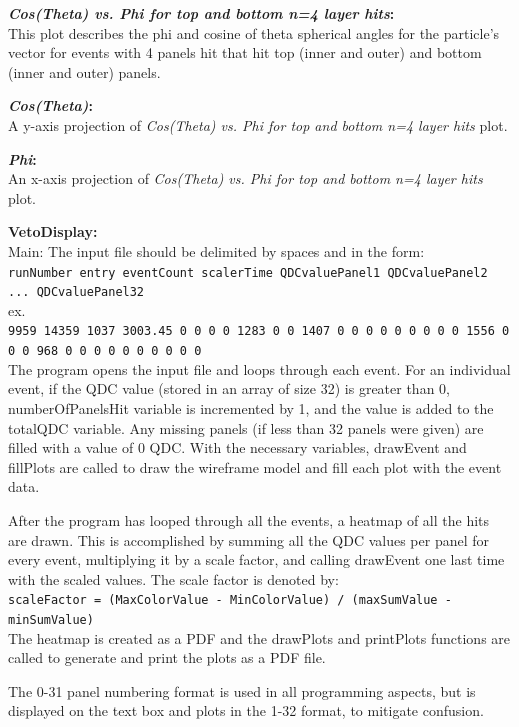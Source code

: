 \documentclass[a4paper,12pt]{article}
\begin{document}
\textbf{\emph{Cos(Theta) vs. Phi for top and bottom n=4 layer hits}:} \\
This plot describes the phi and cosine of theta spherical angles for the particle's vector for events with 4 panels hit that hit top (inner and outer) and bottom (inner and outer) panels. 

\textbf{\emph{Cos(Theta)}:} \\
A y-axis projection of \emph{Cos(Theta) vs. Phi for top and bottom n=4 layer hits} plot.

\textbf{\emph{Phi}:} \\
An x-axis projection of \emph{Cos(Theta) vs. Phi for top and bottom n=4 layer hits} plot.

\pagebreak

\textbf{VetoDisplay:} \\
Main:
The input file should be delimited by spaces and in the form: \\
\texttt{runNumber entry eventCount scalerTime QDCvaluePanel1 QDCvaluePanel2 ... QDCvaluePanel32} \\
ex. \\
\texttt{9959 14359 1037 3003.45 0 0 0 0 1283 0 0 1407 0 0 0 0 0 0 0 0 0 1556 0 0 0 968 0 0 0 0 0 0 0 0 0 0 } \\
The program opens the input file and loops through each event. For an individual event, if the QDC value (stored in an array of size 32) is greater than 0, numberOfPanelsHit variable is incremented by 1, and the value is added to the totalQDC variable. Any missing panels (if less than 32 panels were given) are filled with a value of 0 QDC. With the necessary variables, drawEvent and fillPlots are called to draw the wireframe model and fill each plot with the event data. 

After the program has looped through all the events, a heatmap of all the hits are drawn. This is accomplished by summing all the QDC values per panel for every event, multiplying it by a scale factor, and calling drawEvent one last time with the scaled values. The scale factor is denoted by: \\
\texttt{scaleFactor = (MaxColorValue - MinColorValue) / (maxSumValue - minSumValue)} \\
The heatmap is created as a PDF and the drawPlots and printPlots functions are called to generate and print the plots as a PDF file.

The 0-31 panel numbering format is used in all programming aspects, but is displayed on the text box and plots in the 1-32 format, to mitigate confusion.
\end{document}

